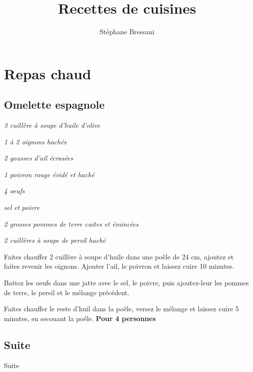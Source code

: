 \documentclass[10pt,a4paper]{report}
\author{Stéphane Bressani}
\title{Recettes de cuisines}
\begin{document}
    \maketitle
    \tableofcontents

    \chapter{Repas chaud}
    \section{Omelette espagnole}

    \begin{multicols}{2}
        \parbox[1cm]{\textwidth}{
            \begin{ingredients}
                \item \textit{3 cuillère à soupe d'huile d'olive}
                \item \textit{1 à 2 oignons hachés}
                \item \textit{2 gousses d'ail écrasées}
                \item \textit{1 poivron rouge évidé et haché}
                \item \textit{4 oeufs}
                \item \textit{sel et poivre}
                \item \textit{2 grosses pommes de terre cuites et émincées}
                \item \textit{2 cuillères à soupe de persil haché}
            \end{ingredients}
        }
        \columnbreak

        Faites chauffer 2 cuillère à soupe d'huile dans une poêle de 24 cm, ajoutez et faites revenir les oignons. Ajouter l'ail, le poivron et laissez cuire 10 minutes.
        \newline

        Battez les oeufs dans une jatte avec le sel, le poivre, puis ajoutez-leur les pommes de terre, le persil et le mélange précédent.
        \newline

        Faites chauffer le reste d'huil dans la poêle, versez le mélange et laissez cuire 5 minutes, en secouant la poêle.
        \newline
        \newline
        \textbf{Pour 4 personnes}
    \end{multicols}
    \section{Suite}
    Suite
\end{document}
